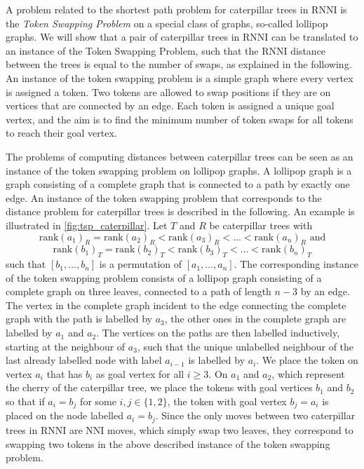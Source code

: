 \documentclass[11pt]{amsart}
\newcommand{\rnni}{\mathrm{RNNI}}
\newcommand{\rank}{\mathrm{rank}}
\newcommand{\nni}{\mathrm{NNI}}
\begin{document}
A problem related to the shortest path problem for caterpillar trees in $\rnni$ is the \emph{Token Swapping Problem} \autocite{Kawahara2017-ey} on a special class of graphs, so-called lollipop graphs.
We will show that a pair of caterpillar trees in $\rnni$ can be translated to an instance of the Token Swapping Problem, such that the $\rnni$ distance between the trees is equal to the number of swaps, as explained in the following.
An instance of the token swapping problem is a simple graph where every vertex is assigned a token.
Two tokens are allowed to swap positions if they are on vertices that are connected by an edge.
Each token is assigned a unique goal vertex, and the aim is to find the minimum number of token swaps for all tokens to reach their goal vertex.

The problems of computing distances between caterpillar trees can be seen as an instance of the token swapping problem on lollipop graphs.
A lollipop graph is a graph consisting of a complete graph that is connected to a path by exactly one edge.
An instance of the token swapping problem that corresponds to the distance problem for caterpillar trees is described in the following.
An example is illustrated in \autoref{fig:tsp_caterpillar}.
Let $T$ and $R$ be caterpillar trees with
\[\rank(a_1)_R = \rank(a_2)_R < \rank(a_3)_R < \ldots < \rank(a_n)_R \text{ and}\]
\[\rank(b_1)_T = \rank(b_2)_T < \rank(b_3)_T < \ldots < \rank(b_n)_T\]
such that $[b_1, \ldots, b_n]$ is a permutation of $[a_1, \ldots, a_n]$.
The corresponding instance of the token swapping problem consists of a lollipop graph consisting of a complete graph on three leaves, connected to a path of length $n-3$ by an edge.
The vertex in the complete graph incident to the edge connecting the complete graph with the path is labelled by $a_3$, the other ones in the complete graph are labelled by $a_1$ and $a_2$.
The vertices on the paths are then labelled inductively, starting at the neighbour of $a_3$, such that the unique unlabelled neighbour of the last already labelled node with label $a_{i-1}$ is labelled by $a_i$.
We place the token on vertex $a_i$ that has $b_i$ as goal vertex for all $i \geq 3$.
On $a_1$ and $a_2$, which represent the cherry of the caterpillar tree, we place the tokens with goal vertices $b_1$ and $b_2$ so that if $a_i = b_j$ for some $i,j \in \{1,2\}$, the token with goal vertex $b_j=a_i$ is placed on the node labelled $a_i=b_j$.
Since the only moves between two caterpillar trees in $\rnni$ are $\nni$ moves, which simply swap two leaves, they correspond to swapping two tokens in the above described instance of the token swapping problem.
\end{document}
